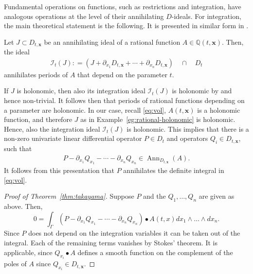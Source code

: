 \documentclass[sigconf, nonacm]{acmart} %
\begin{document}
Fundamental operations on functions, such as restrictions and integration, have analogous operations at the level of their annihilating $D$-ideals. For integration, the main theoretical statement is the following. It is presented in similar form in {\cite[Thm. 5.5.1]{SST}}.
\begin{theorem}\label{thm:takayama}
    Let $J \subset D_{t, \mathbf{x}}$ be an annihilating ideal of a rational function $A\in \mathbb Q (t, \mathbf{x})$. Then, the ideal 
    \begin{align}
        \mathcal I_{t}(J): = (J + \partial_{x_1}D_{t, \textbf{x}} + \cdots +\partial_{x_n} D_{t,\textbf{x}} ) \quad \cap  \quad  D_t
    \end{align}
    annihilates periods of $A$ that depend on the parameter $t$. 
\end{theorem}
If $J$ is holonomic, then also its integration ideal $\mathcal I_{t}(J)$ is holonomic by \cite[Thm. 6.10.3]{Takayama2013} and hence non-trivial. It follows then that periods of rational functions depending on a parameter are holonomic.
In our case, recall \eqref{eq:vol}, $A(t,  \mathbf{x})$ is a holonomic function, and therefore $J$ as in Example~\ref{eg:rational-holonomic} is holonomic. Hence, also the integration ideal $\mathcal I_{t}(J)$ is holonomic. This implies that there is a non-zero univariate linear differential operator $P \in D_{t}$ and operators $Q_i \in D_{t,\mathbf{x}}$, such that \begin{align}\label{eq:picard--fuchs}
    P - \partial_{x_1}Q_{x_1} - \cdots - \partial_{x_n} Q_{x_n} \in \operatorname{Ann}_{D_{t, \mathbf{x}}}(A).
\end{align}
It follows from this presentation that $P$ annihilates the definite integral in \eqref{eq:vol}.
\begin{proof}[Proof of Theorem~\ref{thm:takayama}]
    Suppose $P$ and the $Q_1, \ldots, Q_n$ are given as above. Then,
    \begin{equation*}
        0 = \int_\Gamma (P  -\partial_{x_1}Q_{x_1} - \cdots - \partial_{x_n} Q_{x_n} )\bullet A(t,x) dx_1\wedge \ldots \wedge dx_n.
    \end{equation*}
    Since $P$ does not depend on the integration variables it can be taken out of the integral. Each of the remaining terms vanishes by Stokes' theorem. It is applicable, since $Q_{x_i}\bullet A$ defines a smooth function on the complement of the poles of $A$ since $Q_{x_i} \in D_{t,\mathbf{x}}$.
\end{proof}
\end{document}
